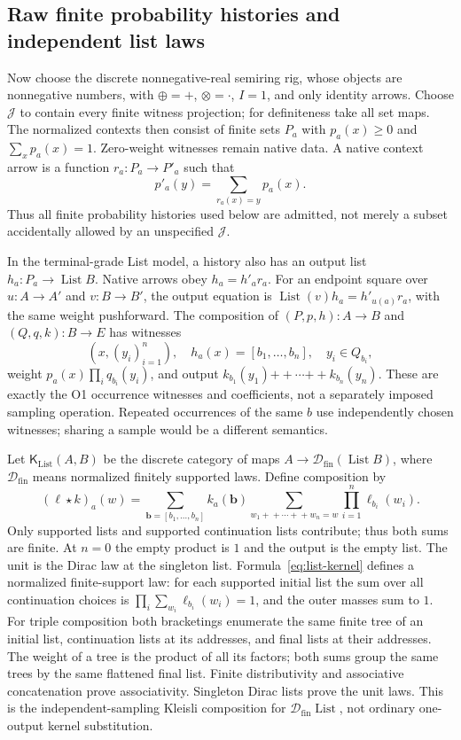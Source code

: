 \documentclass[11pt,a4paper]{article}
\theoremstyle{definition}
\newcommand{\J}{\mathcal J}
\newcommand{\List}{\operatorname{List}}
\begin{document}
\subsection{Raw finite probability histories and independent list laws}
Now choose the discrete nonnegative-real semiring rig, whose objects are
nonnegative numbers, with $\oplus=+$, $\otimes=\cdot$, $I=1$, and only
identity arrows. Choose $\J$ to contain every finite witness projection;
for definiteness take all set maps. The normalized contexts then consist
of finite sets $P_a$ with $p_a(x)\ge0$ and $\sum_xp_a(x)=1$.
Zero-weight witnesses remain native data. A native context arrow is a
function $r_a:P_a\to P'_a$ such that
\[
 p'_a(y)=\sum_{r_a(x)=y}p_a(x).
\]
Thus all finite probability histories used below are admitted, not merely
a subset accidentally allowed by an unspecified $\J$.

In the terminal-grade List model, a history also has an output list
$h_a:P_a\to\List B$. Native arrows obey $h_a=h'_ar_a$.
For an endpoint square over $u:A\to A'$ and $v:B\to B'$, the output
equation is $\List(v)h_a=h'_{u(a)}r_a$, with the same weight pushforward.
The composition of $(P,p,h):A\to B$ and $(Q,q,k):B\to E$ has witnesses
\begin{equation}\label{eq:list-histories}
 (x,(y_i)_{i=1}^n),\quad h_a(x)=[b_1,\ldots,b_n],\quad
 y_i\in Q_{b_i},
\end{equation}
weight $p_a(x)\prod_iq_{b_i}(y_i)$, and output
$k_{b_1}(y_1)\mathbin{+\!+}\cdots\mathbin{+\!+}k_{b_n}(y_n)$.
These are exactly the O1 occurrence witnesses and coefficients, not a
separately imposed sampling operation. Repeated occurrences of the same
$b$ use independently chosen witnesses; sharing a sample would be a
different semantics.

Let $\mathsf K_{\List}(A,B)$ be the discrete category of maps
$A\to\mathcal D_{\mathrm{fin}}(\List B)$, where $\mathcal D_{\mathrm{fin}}$
means normalized finitely supported laws. Define composition by
\begin{equation}\label{eq:list-kernel}
 (\ell\star k)_a(w)=
 \sum_{\mathbf b=[b_1,\ldots,b_n]}k_a(\mathbf b)
 \sum_{w_1+\!+\cdots+\!+w_n=w}\prod_{i=1}^n\ell_{b_i}(w_i).
\end{equation}
Only supported lists and supported continuation lists contribute; thus both
sums are finite. At $n=0$ the empty product is $1$ and the output is the
empty list. The unit is the Dirac law at the singleton list.
Formula~\eqref{eq:list-kernel} defines a normalized finite-support law:
for each supported initial list the sum over all continuation choices is
$\prod_i\sum_{w_i}\ell_{b_i}(w_i)=1$, and the outer masses sum to $1$.
For triple composition both bracketings enumerate the same finite tree of
an initial list, continuation lists at its addresses, and final lists at
their addresses. The weight of a tree is the product of all its factors;
both sums group the same trees by the same flattened final list. Finite
distributivity and associative concatenation prove associativity. Singleton
Dirac lists prove the unit laws. This is the independent-sampling Kleisli
composition for $\mathcal D_{\mathrm{fin}}\List$, not ordinary one-output
kernel substitution.
\end{document}
